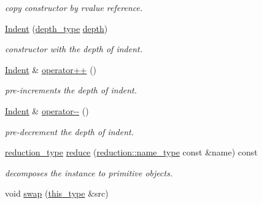 \begin{DoxyCompactItemize}
\begin{DoxyCompactList}\small\item\em copy constructor by rvalue reference. \end{DoxyCompactList}\item 
\hypertarget{classhryky_1_1_indent_a490d406a02496884b2139c9f3d00142c}{\hyperlink{classhryky_1_1_indent_a490d406a02496884b2139c9f3d00142c}{Indent} (\hyperlink{classhryky_1_1_indent_a38d8402509b64e77009a1a86b6be4939}{depth\-\_\-type} \hyperlink{classhryky_1_1_indent_a2bbdf69a07840bff3cc52397d67ea29d}{depth})}\label{classhryky_1_1_indent_a490d406a02496884b2139c9f3d00142c}

\begin{DoxyCompactList}\small\item\em constructor with the depth of indent. \end{DoxyCompactList}\item 
\hypertarget{classhryky_1_1_indent_a93a624188c9a11cc232123bb5e32c7f4}{\hyperlink{classhryky_1_1_indent}{Indent} \& \hyperlink{classhryky_1_1_indent_a93a624188c9a11cc232123bb5e32c7f4}{operator++} ()}\label{classhryky_1_1_indent_a93a624188c9a11cc232123bb5e32c7f4}

\begin{DoxyCompactList}\small\item\em pre-\/increments the depth of indent. \end{DoxyCompactList}\item 
\hypertarget{classhryky_1_1_indent_a646263653f027dad0016976d0539aadb}{\hyperlink{classhryky_1_1_indent}{Indent} \& \hyperlink{classhryky_1_1_indent_a646263653f027dad0016976d0539aadb}{operator-\/-\/} ()}\label{classhryky_1_1_indent_a646263653f027dad0016976d0539aadb}

\begin{DoxyCompactList}\small\item\em pre-\/decrement the depth of indent. \end{DoxyCompactList}\item 
\hypertarget{classhryky_1_1_indent_aeef48d6fd0d4102dc1ee6170f18b5000}{\hyperlink{namespacehryky_a343a9a4c36a586be5c2693156200eadc}{reduction\-\_\-type} \hyperlink{classhryky_1_1_indent_aeef48d6fd0d4102dc1ee6170f18b5000}{reduce} (\hyperlink{namespacehryky_1_1reduction_ac686c30a4c8d196bbd0f05629a6b921f}{reduction\-::name\-\_\-type} const \&name) const }\label{classhryky_1_1_indent_aeef48d6fd0d4102dc1ee6170f18b5000}

\begin{DoxyCompactList}\small\item\em decomposes the instance to primitive objects. \end{DoxyCompactList}\item 
\hypertarget{classhryky_1_1_indent_ae963d985eb24577918e5f00f47cd30b3}{void \hyperlink{classhryky_1_1_indent_ae963d985eb24577918e5f00f47cd30b3}{swap} (\hyperlink{classhryky_1_1_indent_acbe5e44b7c58ede382914e8a3f7d2987}{this\-\_\-type} \&src)}\label{classhryky_1_1_indent_ae963d985eb24577918e5f00f47cd30b3}


\end{DoxyCompactItemize}
